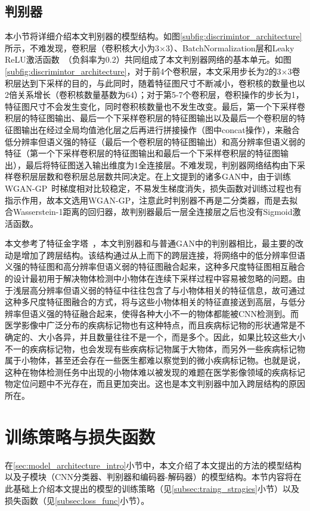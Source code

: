 \subsection{判别器}\label{subsec:discrimintor_model}
本小节将详细介绍本文判别器的模型结构。如图\ref{subfig:discrimintor_architecture}所示，不难发现，卷积层（卷积核大小为3$\times$3）、BatchNormalization层和Leaky ReLU激活函数~\cite{maas2013rectifier}（负斜率为0.2）共同组成了本文判别器网络的基本单元。如图\ref{subfig:discrimintor_architecture}，对于前4个卷积层，本文采用步长为2的3$\times$3卷积层达到下采样的目的，与此同时，随着特征图尺寸不断减小，卷积核的数量也以2倍关系增长（卷积核数量基数为64）；对于第5-7个卷积层，卷积操作的步长为1，特征图尺寸不会发生变化，同时卷积核数量也不发生改变。最后，第一个下采样卷积层的特征图输出、最后一个下采样卷积层的特征图输出以及最后一个卷积层的特征图输出在经过全局均值池化层之后再进行拼接操作（图中concat操作），来融合低分辨率但语义强的特征（最后一个卷积层的特征图输出）和高分辨率但语义弱的特征（第一个下采样卷积层的特征图输出和最后一个下采样卷积层的特征图输出），最后将特征图送入输出维度为1全连接层。不难发现，判别器网络结构由下采样卷积层层数和卷积层总层数共同决定。在上文提到的诸多GAN中，由于训练WGAN-GP~\cite{gulrajani2017improved}时梯度相对比较稳定，不易发生梯度消失，损失函数对训练过程也有指示作用，故本文选用WGAN-GP，注意此时判别器不再是二分类器，而是去拟合Wasserstein-1距离的回归器，故判别器最后一层全连接层之后也没有Sigmoid激活函数。

本文参考了特征金字塔~\cite{lin2017feature}，本文判别器和与普通GAN中的判别器相比，最主要的改动是增加了跨层结构。该结构通过从上而下的跨层连接，将网络中的低分辨率但语义强的特征图和高分辨率但语义弱的特征图融合起来，这种多尺度特征图相互融合的设计最初用于解决物体检测中小物体在连续下采样过程中容易被忽略的问题。由于浅层高分辨率但语义弱的特征中往往包含了与小物体相关的特征信息，故可通过这种多尺度特征图融合的方式，将与这些小物体相关的特征直接送到高层，与低分辨率但语义强的特征融合起来，使得各种大小不一的物体都能被CNN检测到。而医学影像中广泛分布的疾病标记物也有这种特点，而且疾病标记物的形状通常是不确定的、大小各异，并且数量往往不是一个，而是多个。因此，如果比较这些大小不一的疾病标记物，也会发现有些疾病标记物属于大物体，而另外一些疾病标记物属于小物体，甚至还会存在一些医生都难以察觉到的微小疾病标记物。也就是说，这种在物体检测任务中出现的小物体难以被发现的难题在医学影像领域的疾病标记物定位问题中不光存在，而且更加突出。这也是本文判别器中加入跨层结构的原因所在。

\section{训练策略与损失函数}\label{sec:loss_func_training_stragies}
在\ref{sec:model_architecture_intro}小节中，本文介绍了本文提出的方法的模型结构以及子模块（CNN分类器、判别器和编码器-解码器）的模型结构。本节内容将在此基础上介绍本文提出的模型的训练策略（见\ref{subsec:traing_stragies}小节）以及损失函数（见\ref{subsec:loss_func}小节）。
